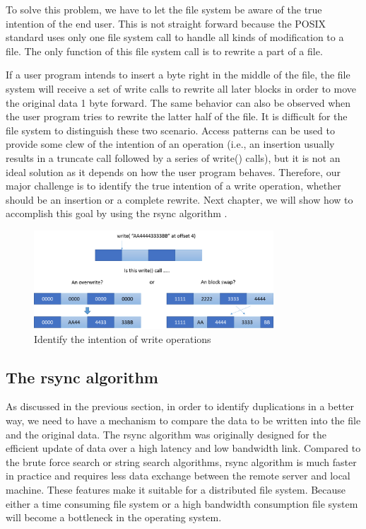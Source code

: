     To solve this problem, we have to let the file system be aware of the true intention of the end user. This is not straight forward because the POSIX standard uses only one file system call to handle all kinds of modification to a file. The only function of this file system call is to rewrite a part of a file.
    
    If a user program intends to insert a byte right in the middle of the file, the file system will receive a set of write calls to rewrite all later blocks in order to move the original data 1 byte forward. The same behavior can also be observed when the user program tries to rewrite the latter half of the file. It is difficult for the file system to distinguish these two scenario. Access patterns can be used to provide some clew of the intention of an operation (i.e., an insertion usually results in a truncate call followed by a series of write() calls), but it is not an ideal solution as it depends on how the user program behaves. Therefore, our major challenge is to identify the true intention of a write operation, whether should be an insertion or a complete rewrite. Next chapter, we will show how to accomplish this goal by using the rsync algorithm \cite{rsync_alg}.

\begin{figure}[t]
\centering
\includegraphics[width=0.8\textwidth]{Chapter-4/figs/fig6.png}
\caption{Identify the intention of write operations}
\label{fig:write_intention}
\end{figure}

\subsection{The rsync algorithm}

    As discussed in the previous section, in order to identify duplications in a better way, we need to have a mechanism to compare the data to be written into the file and the original data. The rsync algorithm was originally designed for the efficient update of data over a high latency and low bandwidth link. Compared to the brute force search or string search algorithms, rsync algorithm is much faster in practice and requires less data exchange between the remote server and local machine. These features make it suitable for a distributed file system. Because either a time consuming file system or a high bandwidth consumption file system will become a bottleneck in the operating system.

